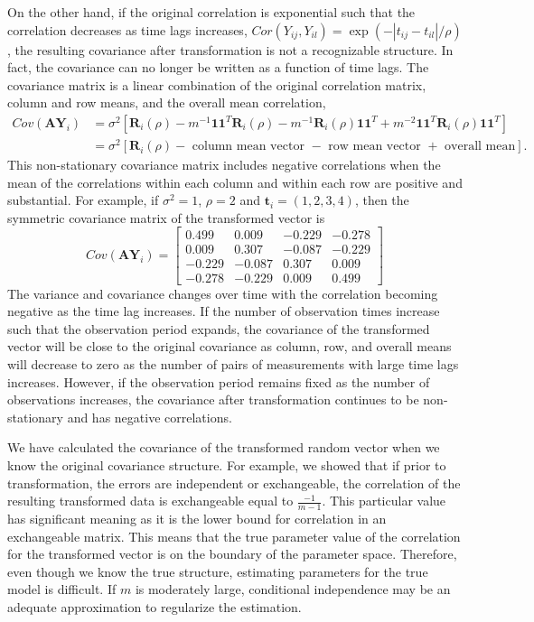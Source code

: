 \documentclass[12pt]{article}
\newcommand{\B}[0]{\mathbf}
\begin{document}
 On the other hand, if the original correlation is exponential such that the correlation decreases as time lags increases, $Cor(Y_{ij},Y_{il}) = \exp(-|t_{ij}-t_{il}|/\rho)$, the resulting covariance after transformation is not a recognizable structure. In fact, the covariance can no longer be written as a function of time lags. The covariance matrix is a linear combination of the original correlation matrix, column and row means, and the overall mean correlation,
   \begin{align*}
 Cov(\B A\B Y_{i}) &= \sigma^{2}\left[\B R_{i}(\rho)-m^{-1}\B1\B1^{T}\B R_{i}(\rho)-m^{-1}\B R_{i}(\rho)\B1\B1^{T} + m^{-2}\B1\B1^{T}\B R_{i}(\rho)\B1\B1^{T}\right]\\
  &= \sigma^{2}\left[\B R_{i}(\rho)-\text{ column mean vector }-\text{ row mean vector } + \text{ overall mean}\right].
 \end{align*} 
 This non-stationary covariance matrix includes negative correlations when the mean of the correlations within each column and within each row are positive and substantial. For example, if $\sigma^{2}=1$, $\rho = 2$ and $\B t_{i}=(1,2,3,4)$, then the symmetric covariance matrix of the transformed vector is
$$ Cov(\B A\B Y_{i}) = \left[ \begin{array}{cccc}
 0.499&  0.009& -0.229& -0.278\\
  0.009&  0.307& -0.087& -0.229\\
 -0.229& -0.087&  0.307&  0.009\\
 -0.278& -0.229&  0.009&  0.499
\end{array}\right]$$
The variance and covariance changes over time with the correlation becoming negative as the time lag increases.  If the number of observation times increase such that the observation period expands, the covariance of the transformed vector will be close to the original covariance as column, row, and overall means will decrease to zero as the number of pairs of measurements with large time lags increases. However, if the observation period remains fixed as the number of observations increases, the covariance after transformation continues to be non-stationary and has negative correlations.  

We have calculated the covariance of the transformed random vector when we know the original covariance structure. For example, we showed that if prior to transformation, the errors are independent or exchangeable, the correlation of the resulting transformed data is exchangeable equal to $\frac{-1}{m-1}$. This particular value has significant meaning as it is the lower bound for correlation in an exchangeable matrix. This means that the true parameter value of the correlation for the transformed vector is on the boundary of the parameter space. Therefore, even though we know the true structure, estimating parameters for the true model is difficult. If $m$ is moderately large, conditional independence may be an adequate approximation to regularize the estimation. 
 
\end{document}
